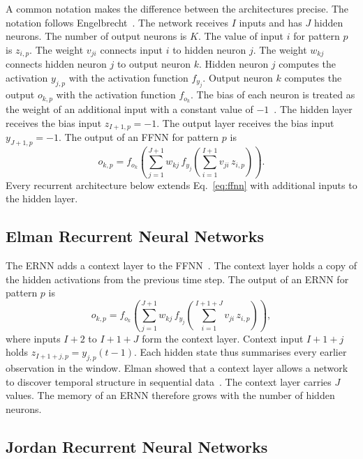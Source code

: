 \documentclass[conference,10pt]{IEEEtran}
\begin{document}
A common notation makes the difference between the architectures
precise.
The notation follows Engelbrecht~\cite{engelbrecht2007}.
The network receives $I$ inputs and has $J$ hidden neurons.
The number of output neurons is $K$.
The value of input $i$ for pattern $p$ is $z_{i,p}$.
The weight $v_{ji}$ connects input $i$ to hidden neuron $j$.
The weight $w_{kj}$ connects hidden neuron $j$ to output neuron $k$.
Hidden neuron $j$ computes the activation $y_{j,p}$ with the activation
function $f_{y_j}$.
Output neuron $k$ computes the output $o_{k,p}$ with the activation
function $f_{o_k}$.
The bias of each neuron is treated as the weight of an additional input
with a constant value of $-1$~\cite{engelbrecht2007}.
The hidden layer receives the bias input $z_{I+1,p} = -1$.
The output layer receives the bias input $y_{J+1,p} = -1$.
The output of an FFNN for pattern $p$ is
\begin{equation}
o_{k,p} = f_{o_k}\!\left(\sum_{j=1}^{J+1} w_{kj}\,
  f_{y_j}\!\left(\sum_{i=1}^{I+1} v_{ji}\, z_{i,p}\right)\right).
\label{eq:ffnn}
\end{equation}
Every recurrent architecture below extends Eq.~\eqref{eq:ffnn} with
additional inputs to the hidden layer.

\subsection{Elman Recurrent Neural Networks}

The ERNN adds a context layer to the FFNN~\cite{elman1990}.
The context layer holds a copy of the hidden activations from the
previous time step.
The output of an ERNN for pattern $p$ is
\begin{equation}
o_{k,p} = f_{o_k}\!\left(\sum_{j=1}^{J+1} w_{kj}\,
  f_{y_j}\!\left(\sum_{i=1}^{I+1+J} v_{ji}\, z_{i,p}\right)\right),
\label{eq:elman}
\end{equation}
where inputs $I+2$ to $I+1+J$ form the context layer.
Context input $I+1+j$ holds $z_{I+1+j,p} = y_{j,p}(t-1)$.
Each hidden state thus summarises every earlier observation in the
window.
Elman showed that a context layer allows a network to discover temporal
structure in sequential data~\cite{elman1990}.
The context layer carries $J$ values.
The memory of an ERNN therefore grows with the number of hidden
neurons.

\subsection{Jordan Recurrent Neural Networks}
\end{document}
